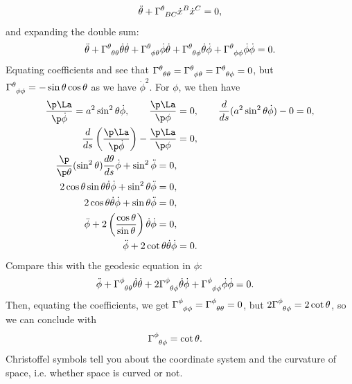 \documentclass[a4paper, 11pt, normalem]{report}
\begin{document}
\begin{equation}
    \ddot{\theta} + \tensor{\Gamma}{^\theta_{BC}}\dot{x}^B\dot{x}^C = 0,
\end{equation}
and expanding the double sum:
\begin{align}
    \ddot{\theta} + \tensor{\Gamma}{^\theta_{\theta\theta}}\dot{\theta}\dot{\theta} + \tensor{\Gamma}{^\theta_{\phi\theta}}\dot{\phi}\dot{\theta} + \tensor{\Gamma}{^\theta_{\theta\phi}}\dot{\theta}\dot{\phi} + \tensor{\Gamma}{^\theta_{\phi\phi}}\dot{\phi}\dot{\phi} = 0.
\end{align}
Equating coefficients and see that $\tensor{\Gamma}{^\theta_{\theta\theta}}=\tensor{\Gamma}{^\theta_{\phi\theta}}=\tensor{\Gamma}{^\theta_{\theta\phi}}=0$, but $\tensor{\Gamma}{^\theta_{\phi\phi}}=-\sin\theta\cos\theta$ as we have $\dot{\phi}^2$.
For $\phi$, we then have
\begin{align}
    \frac{\p\La}{\p\dot{\phi}} = a^2\sin^2\theta\dot{\phi},\qquad \frac{\p\La}{\p\phi} &= 0,\qquad \frac{d}{ds}(a^2\sin^2\theta\dot{\phi})-0 = 0, \\
    \frac{d}{ds}\left(\frac{\p\La}{\p\dot{\phi}}\right) - \frac{\p\La}{\p\phi} &= 0,\\
    \begin{split}
        \frac{\p}{\p\theta}(\sin^2\theta)\frac{d\theta}{ds}\dot{\phi} + \sin^2\ddot{\phi} &= 0, \\
        2\cos\theta\sin\theta\dot{\theta}\dot{\phi} + \sin^2\theta\ddot{\phi} &= 0,\\
        2\cos\theta\dot{\theta}\dot{\phi} + \sin\theta\ddot{\phi} &= 0, \\
        \ddot{\phi} + 2\left(\frac{\cos\theta}{\sin\theta}\right)\dot{\theta}\dot{\phi} &= 0,
    \end{split}\\
    \ddot{\phi} + 2\cot\theta\dot{\theta}\dot{\phi} &= 0.
\end{align}
Compare this with the geodesic equation in $\phi$:
\begin{align}
    \ddot{\phi} + \tensor{\Gamma}{^\phi_{\theta\theta}}\dot{\theta}\dot{\theta} + 2\tensor{\Gamma}{^\phi_{\theta\phi}}\dot{\theta}\dot{\phi} + \tensor{\Gamma}{^\phi_{\phi\phi}}\dot{\phi}\dot{\phi} &= 0.
\end{align}
Then, equating the coefficients, we get $\tensor{\Gamma}{^\phi_{\phi\phi}} = \tensor{\Gamma}{^\phi_{\theta\theta}} = 0$, but $2\tensor{\Gamma}{^\phi_{\theta\phi}} = 2\cot\theta$, so we can conclude with
\begin{align}
    \tensor{\Gamma}{^\phi_{\theta\phi}} &= \cot\theta.
\end{align}
Christoffel symbols tell you about the coordinate system and the curvature of space, i.e. whether space is curved or not. 
\end{document}
